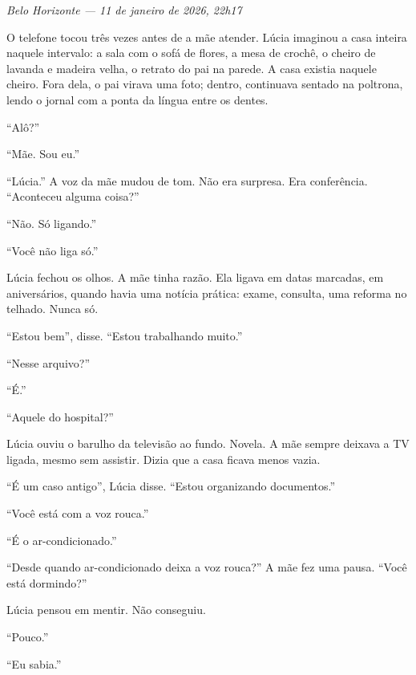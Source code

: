 
\noindent \textit{Belo Horizonte --- 11 de janeiro de 2026, 22h17}

\noindent O telefone tocou três vezes antes de a mãe atender. Lúcia imaginou a casa inteira naquele intervalo: a sala com o sofá de flores, a mesa de crochê, o cheiro de lavanda e madeira velha, o retrato do pai na parede. A casa existia naquele cheiro. Fora dela, o pai virava uma foto; dentro, continuava sentado na poltrona, lendo o jornal com a ponta da língua entre os dentes.

\noindent ``Alô?''

\noindent ``Mãe. Sou eu.''

\noindent ``Lúcia.'' A voz da mãe mudou de tom. Não era surpresa. Era conferência. ``Aconteceu alguma coisa?''

\noindent ``Não. Só ligando.''

\noindent ``Você não liga só.''

\noindent Lúcia fechou os olhos. A mãe tinha razão. Ela ligava em datas marcadas, em aniversários, quando havia uma notícia prática: exame, consulta, uma reforma no telhado. Nunca só.

\noindent ``Estou bem'', disse. ``Estou trabalhando muito.''

\noindent ``Nesse arquivo?''

\noindent ``É.''

\noindent ``Aquele do hospital?''

\noindent Lúcia ouviu o barulho da televisão ao fundo. Novela. A mãe sempre deixava a TV ligada, mesmo sem assistir. Dizia que a casa ficava menos vazia.

\noindent ``É um caso antigo'', Lúcia disse. ``Estou organizando documentos.''

\noindent ``Você está com a voz rouca.''

\noindent ``É o ar-condicionado.''

\noindent ``Desde quando ar-condicionado deixa a voz rouca?'' A mãe fez uma pausa. ``Você está dormindo?''

\noindent Lúcia pensou em mentir. Não conseguiu.

\noindent ``Pouco.''

\noindent ``Eu sabia.''

